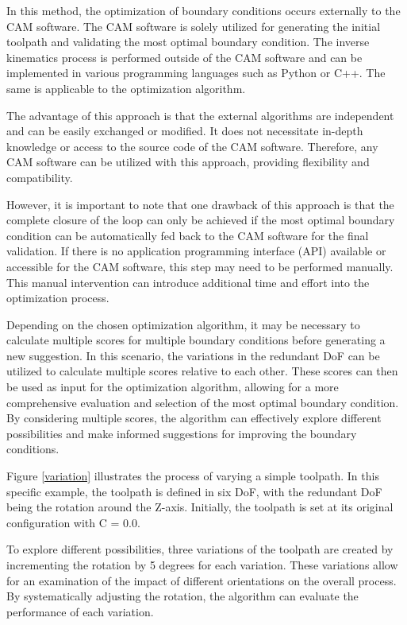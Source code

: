 In this method, the optimization of boundary conditions occurs externally to the \acrshort{CAM} software. The \acrshort{CAM} software is solely utilized for generating the initial toolpath and validating the most optimal boundary condition. The inverse kinematics process is performed outside of the \acrshort{CAM} software and can be implemented in various programming languages such as Python or C++. The same is applicable to the optimization algorithm.

The advantage of this approach is that the external algorithms are independent and can be easily exchanged or modified. It does not necessitate in-depth knowledge or access to the source code of the \acrshort{CAM} software. Therefore, any \acrshort{CAM} software can be utilized with this approach, providing flexibility and compatibility.    

However, it is important to note that one drawback of this approach is that the complete closure of the loop can only be achieved if the most optimal boundary condition can be automatically fed back to the \acrshort{CAM} software for the final validation. If there is no application programming interface (\acrshort{API}) available or accessible for the \acrshort{CAM} software, this step may need to be performed manually. This manual intervention can introduce additional time and effort into the optimization process.

Depending on the chosen optimization algorithm, it may be necessary to calculate multiple scores for multiple boundary conditions before generating a new suggestion. In this scenario, the variations in the redundant \acrshort{DoF} can be utilized to calculate multiple scores relative to each other. These scores can then be used as input for the optimization algorithm, allowing for a more comprehensive evaluation and selection of the most optimal boundary condition. By considering multiple scores, the algorithm can effectively explore different possibilities and make informed suggestions for improving the boundary conditions.

Figure \ref{variation} illustrates the process of varying a simple toolpath. In this specific example, the toolpath is defined in six \acrshort{DoF}, with the redundant \acrshort{DoF} being the rotation around the Z-axis. Initially, the toolpath is set at its original configuration with C = 0.0.

To explore different possibilities, three variations of the toolpath are created by incrementing the rotation by 5 degrees for each variation. These variations allow for an examination of the impact of different orientations on the overall process. By systematically adjusting the rotation, the algorithm can evaluate the performance of each variation.


